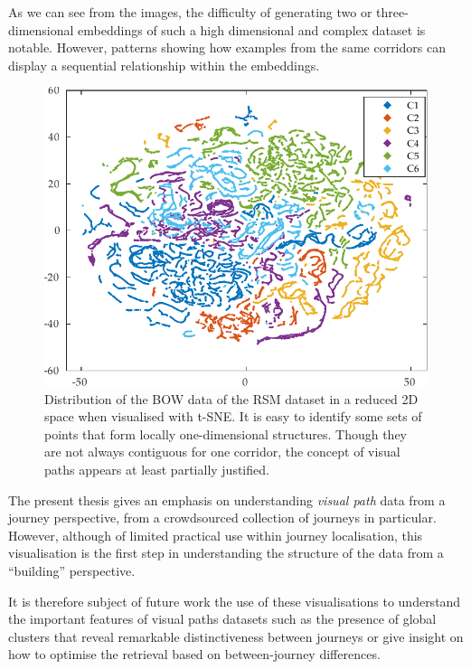 As we can see from the images, the difficulty of generating two or three-dimensional embeddings of such a high dimensional and complex dataset is notable. However, patterns showing how examples from the same corridors can display a sequential relationship within the embeddings.


\begin{figure}
\centering
\includegraphics[width=\textwidth]{gfx/Chapter04/tsne_dsift_2d.pdf}
\caption{Distribution of the BOW data of the RSM dataset in a reduced 2D space when visualised with t-SNE. It is easy to identify some sets of points that form locally one-dimensional structures. Though they are not always contiguous for one corridor, the concept of visual paths appears at least partially justified.}
\label{fig:tsne2d}
\end{figure}

The present thesis gives an emphasis on understanding \textit{visual path} data from a journey perspective, from a crowdsourced collection of journeys in particular. However, although of limited practical use within journey localisation, this visualisation is the first step in understanding the structure of the data from a ``building'' perspective.

It is therefore subject of future work the use of these visualisations to understand the important features of visual paths datasets such as the presence of global clusters that reveal remarkable distinctiveness between journeys or give insight on how to optimise the retrieval based on between-journey differences.

